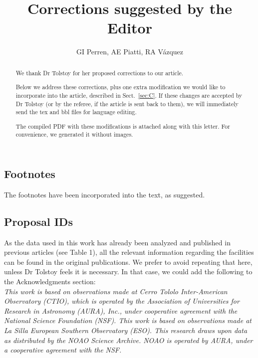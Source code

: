 \documentclass{article}
\begin{document}
\title{Corrections suggested by the Editor}
\author{GI Perren, AE Piatti, RA V\'azquez}

\maketitle


\begin{abstract}
We thank Dr Tolstoy for her proposed corrections to our article.

Below we address these corrections, plus one extra modification we would like to
incorporate into the article, described in Sect.~\ref{sec:C}.
%
If these changes are accepted by Dr Tolstoy (or by the referee, if the article
is sent back to them), we will immediately send the tex and bbl files for
language editing.

The compiled PDF with these modifications is attached along with this letter.
For convenience, we generated it without images.
\end{abstract}

\clearpage

\renewcommand\thesubsection{\Alph{subsection}}
\subsection{Footnotes}
The footnotes have been incorporated into the text, as suggested.


%
\subsection{Proposal IDs}
As the data used in this work has already been analyzed and published in
previous articles (see Table 1), all the relevant information regarding the
facilities can be found in the original publications.
We prefer to avoid repeating that here, unless Dr Tolstoy feels it is necessary.
In that case, we could add the following to the Acknowledgments section:\\

\noindent \emph{This work is based on observations made at Cerro Tololo
Inter-American Observatory (CTIO), which is operated by the Association of
Universities for Research in Astronomy (AURA), Inc., under cooperative agreement
with the National Science Foundation (NSF).
%
This work is based on observations made at La Silla European Southern
Observatory (ESO).
%
This research draws upon data as distributed by the NOAO Science Archive.
NOAO is operated by AURA, under a cooperative agreement with the NSF.}
\end{document}
